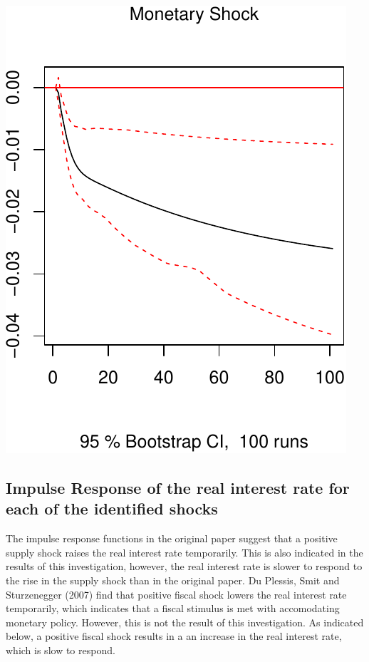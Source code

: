 \documentclass[11pt,preprint, authoryear]{elsarticle}
\numberwithin{equation}{section}
\numberwithin{figure}{section}
\numberwithin{table}{section}
\begin{document}
\includegraphics{TS_proj_files/figure-latex/unnamed-chunk-18-3.pdf}

\newpage

\hypertarget{impulse-response-of-the-real-interest-rate-for-each-of-the-identified-shocks}{%
\subsection{Impulse Response of the real interest rate for each of the
identified
shocks}\label{impulse-response-of-the-real-interest-rate-for-each-of-the-identified-shocks}}

The impulse response functions in the original paper suggest that a
positive supply shock raises the real interest rate temporarily. This is
also indicated in the results of this investigation, however, the real
interest rate is slower to respond to the rise in the supply shock than
in the original paper. Du Plessis, Smit and Sturzenegger (2007) find
that positive fiscal shock lowers the real interest rate temporarily,
which indicates that a fiscal stimulus is met with accomodating monetary
policy. However, this is not the result of this investigation. As
indicated below, a positive fiscal shock results in a an increase in the
real interest rate, which is slow to respond.
\end{document}
